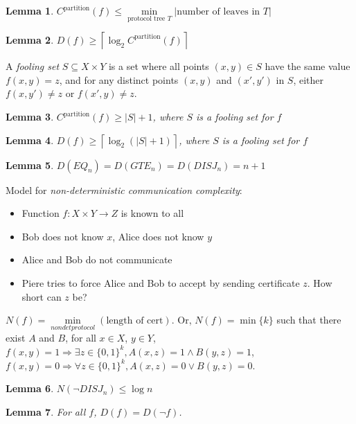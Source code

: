 \documentclass[letterpaper,landscape,11pt]{article}
\newtheorem{lemma}{Lemma}
\begin{document}
\begin{lemma}
	$C^{\text{partition}}(f) \leq \min\limits_{\text{protocol tree } T} |\text{number of leaves in } T|$
\end{lemma}

\begin{lemma}
	$D(f) \geq \left \lceil \log_2 C^{\text{partition}}(f) \right \rceil$
\end{lemma}

A \emph{fooling set} $S \subseteq X \times Y$ is a set where all points $(x, y) \in S$ have the same value $f(x, y) = z$, and for any distinct points $(x, y)$ and $(x', y')$ in $S$, either $f(x, y') \neq z$ or $f(x', y) \neq z$.

\begin{lemma}
	$C^{\text{partition}}(f) \geq |S| + 1$, where $S$ is a fooling set for $f$
\end{lemma}

\begin{lemma}
	$D(f) \geq \left \lceil \log_2(|S| + 1) \right \rceil$, where $S$ is a fooling set for $f$
\end{lemma}

\begin{lemma}
	$D(EQ_n) = D(GTE_n) = D(DISJ_n) = n + 1$
\end{lemma}

Model for \emph{non-deterministic communication complexity}:
\begin{itemize}
	\item Function $f : X \times Y \rightarrow Z$ is known to all
	\item Bob does not know $x$, Alice does not know $y$
	\item Alice and Bob do not communicate
	\item Piere tries to force Alice and Bob to accept by sending certificate $z$. How short can $z$ be?
\end{itemize}

$N(f) = \min\limits_{nondet protocol}(\text{length of cert})$. Or, $N(f) = \min\{k\}$ such that there exist $A$ and $B$, for all $x \in X$, $y \in Y$, $f(x, y) = 1 \Rightarrow \exists z \in \{0, 1\}^k, A(x, z) = 1 \land B(y, z) = 1$, $f(x, y) = 0 \Rightarrow \forall z \in \{0, 1\}^k, A(x, z) = 0 \lor B(y, z) = 0$.

\begin{lemma}
	$N(\lnot DISJ_n) \leq \log n$
\end{lemma}

\begin{lemma}
	For all $f$, $D(f) = D(\lnot f)$.
\end{lemma}
\end{document}
